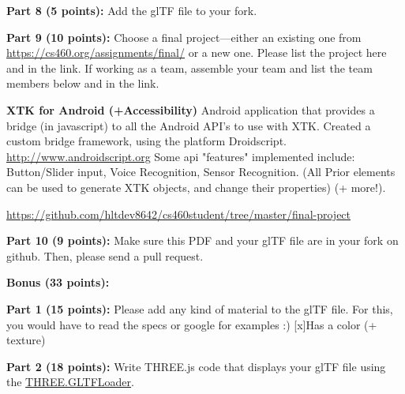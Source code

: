 \documentclass[10pt,oneside,onecolumn,letterpaper]{article}
\begin{document}
\vspace{.5cm}

\noindent\textbf{Part 8 (5 points):} Add the glTF file to your fork.

\vspace{.5cm}

\noindent\textbf{Part 9 (10 points):} Choose a final project---either an existing one from \url{https://cs460.org/assignments/final/} or a new one. Please list the project here and in the link. If working as a team, assemble your team and list the team members below and in the link. 

\vspace{.5cm}



\noindent\textbf{XTK for Android (+Accessibility)} Android application that provides a bridge (in javascript) to all the Android API's to use with XTK. Created a custom bridge framework, using the platform Droidscript. \url{http://www.androidscript.org} Some api "features" implemented include: Button/Slider input, Voice Recognition, Sensor Recognition. (All Prior elements can be used to generate XTK objects, and change their properties) (+ more!).
\vspace{1cm}


\url{https://github.com/hltdev8642/cs460student/tree/master/final-project}

\vspace{3cm}

\noindent\textbf{Part 10 (9 points):} Make sure this PDF and your glTF file are in your fork on github. Then, please send a pull request.

\vspace{.5cm}


\vspace{3cm}

\noindent\textbf{Bonus (33 points):}

\vspace{.5cm}

\noindent\textbf{Part 1 (15 points):} Please add any kind of material to the glTF file. For this, you would have to read the specs or google for examples :)
[x]Has a color (+ texture)
\vspace{.5cm}

\noindent\textbf{Part 2 (18 points):} Write THREE.js code that displays your glTF file using the \url{THREE.GLTFLoader}.
\end{document}
